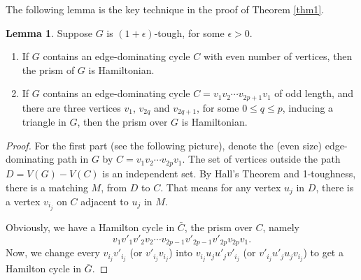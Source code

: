 \documentclass{amsart}
\theoremstyle{definition}
\newtheorem{lemma}{Lemma}
\begin{document}
The following lemma is the key technique in the proof of Theorem \ref{thm1}.
\begin{lemma}\label{keylem}
Suppose $G$ is $(1+\epsilon)$-tough, for some $\epsilon>0$.
\begin{enumerate}
\item If $G$ contains an edge-dominating cycle $C$ with even number of vertices, then the prism of $G$ is Hamiltonian.
\item If $G$ contains an edge-dominating cycle $C=v_1v_2\cdots v_{2p+1}v_1$ of odd length, and there are three vertices $v_1$, $v_{2q}$ and $v_{2q+1}$, for some $0\le q\le p$, inducing a triangle in $G$, then the prism over $G$ is Hamiltonian.
\end{enumerate}
\end{lemma}

\begin{proof}
For the first part (see the following picture), denote the (even size) edge-dominating path in $G$ by $C=v_1v_2\cdots v_{2p}v_1$. The set of vertices outside the path $D=V(G)-V(C)$ is an independent set. By Hall's Theorem and 1-toughness, there is a matching $M$, from $D$ to $C$. That means for any vertex $u_j$ in $D$, there is a vertex $v_{i_j}$ on $C$ adjacent to $u_j$ in $M$.

Obviously, we have a Hamilton cycle in $\bar{C}$, the prism over $C$, namely $$v_1v'_1v'_2v_2\cdots v_{2p-1}v'_{2p-1}v'_{2p}v_{2p}v_1.$$ Now, we change every  $v_{i_j}v'_{i_j}$ (or $v'_{i_j}v_{i_j}$) into $v_{i_j}u_ju'_jv'_{i_j}$ (or $v'_{i_j}u'_ju_jv_{i_j}$) to get a Hamilton cycle in $\bar{G}$.


\end{proof}
\end{document}
